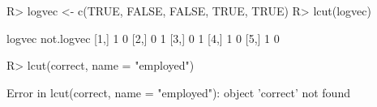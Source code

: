 \begin{Schunk}
% --begin: "lcut.logical"
\begin{Sinput}
R> logvec <- c(TRUE, FALSE, FALSE, TRUE, TRUE)
R> lcut(logvec)
\end{Sinput}
\begin{Soutput}
     logvec not.logvec
[1,]      1          0
[2,]      0          1
[3,]      0          1
[4,]      1          0
[5,]      1          0
\end{Soutput}
\begin{Sinput}
R> lcut(correct, name = "employed")
\end{Sinput}
\begin{Soutput}
Error in lcut(correct, name = "employed"): object 'correct' not found
\end{Soutput}
%
% --end: "lcut.logical"
\end{Schunk}
